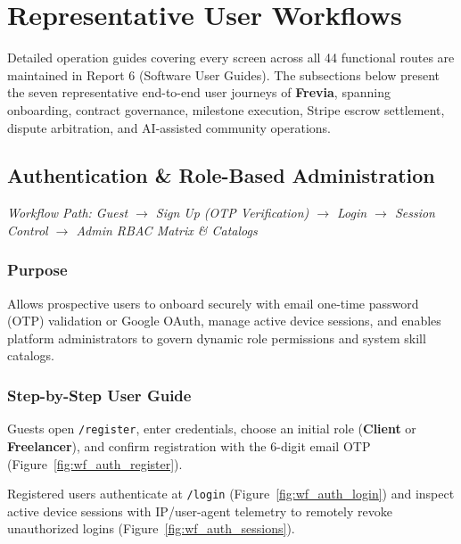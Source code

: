 \label{fig:rel_api_verify}

\section{Representative User Workflows}

Detailed operation guides covering every screen across all 44 functional routes are maintained in Report 6 (Software User Guides). The subsections below present the seven representative end-to-end user journeys of \textbf{Frevia}, spanning onboarding, contract governance, milestone execution, Stripe escrow settlement, dispute arbitration, and AI-assisted community operations.

\subsection{Authentication \& Role-Based Administration}
\noindent\textit{Workflow Path: Guest $\rightarrow$ Sign Up (OTP Verification) $\rightarrow$ Login $\rightarrow$ Session Control $\rightarrow$ Admin RBAC Matrix \& Catalogs}

\subsubsection{Purpose}
Allows prospective users to onboard securely with email one-time password (OTP) validation or Google OAuth, manage active device sessions, and enables platform administrators to govern dynamic role permissions and system skill catalogs.

\subsubsection{Step-by-Step User Guide}

Guests open \texttt{/register}, enter credentials, choose an initial role (\textbf{Client} or \textbf{Freelancer}), and confirm registration with the 6-digit email OTP (Figure~\ref{fig:wf_auth_register}).


Registered users authenticate at \texttt{/login} (Figure~\ref{fig:wf_auth_login}) and inspect active device sessions with IP/user-agent telemetry to remotely revoke unauthorized logins (Figure~\ref{fig:wf_auth_sessions}).

